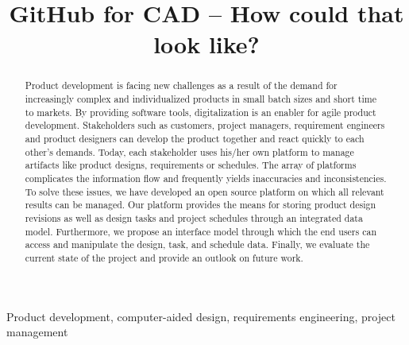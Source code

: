 \title{GitHub for CAD -- How could that look like?}

\author{
    \and
    \and
}

\maketitle

\begin{abstract}
    Product development is facing new challenges as a result of the demand for increasingly complex and individualized products in small batch sizes and short time to markets.
    By providing software tools, digitalization is an enabler for agile product development.
    Stakeholders such as customers, project managers, requirement engineers and product designers can develop the product together and react quickly to each other's demands.
    Today, each stakeholder uses his/her own platform to manage artifacts like product designs, requirements or schedules.
    The array of platforms complicates the information flow and frequently yields inaccuracies and inconsistencies.
    To solve these issues, we have developed an open source platform on which all relevant results can be managed.
    Our platform provides the means for storing product design revisions as well as design tasks and project schedules through an integrated data model.
    Furthermore, we propose an interface model through which the end users can access and manipulate the design, task, and schedule data.
    Finally, we evaluate the current state of the project and provide an outlook on future work. 
\end{abstract}

\begin{IEEEkeywords}
    Product development, computer-aided design, requirements engineering, project management
\end{IEEEkeywords}